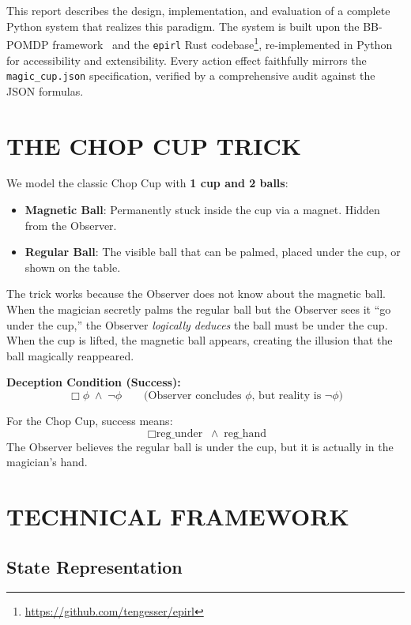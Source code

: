 \documentclass[letterpaper, 10 pt, conference]{ieeeconf}  %
\newcommand{\IBel}[1]{\ensuremath{\Box #1}}   %
\begin{document}
This report describes the design, implementation, and evaluation of a complete Python system that realizes this paradigm. The system is built upon the BB-POMDP framework~\cite{engesser2025} and the \texttt{epirl} Rust codebase\footnote{\url{https://github.com/tengesser/epirl}}, re-implemented in Python for accessibility and extensibility. Every action effect faithfully mirrors the \texttt{magic\_cup.json} specification, verified by a comprehensive audit against the JSON formulas.

\section{THE CHOP CUP TRICK}

We model the classic Chop Cup with \textbf{1 cup and 2 balls}:
\begin{itemize}
    \item \textbf{Magnetic Ball}: Permanently stuck inside the cup via a magnet. Hidden from the Observer.
    \item \textbf{Regular Ball}: The visible ball that can be palmed, placed under the cup, or shown on the table.
\end{itemize}

The trick works because the Observer does not know about the magnetic ball. When the magician secretly palms the regular ball but the Observer sees it ``go under the cup,'' the Observer \emph{logically deduces} the ball must be under the cup. When the cup is lifted, the magnetic ball appears, creating the illusion that the ball magically reappeared.

\textbf{Deception Condition (Success):}
\[
    \IBel{\phi} \;\land\; \neg\phi \qquad \text{(Observer concludes $\phi$, but reality is $\neg\phi$)}
\]

For the Chop Cup, success means:
\[
    \IBel{\text{reg\_under}} \;\land\; \text{reg\_hand}
\]
The Observer believes the regular ball is under the cup, but it is actually in the magician's hand.

\section{TECHNICAL FRAMEWORK}

\subsection{State Representation}
\end{document}

